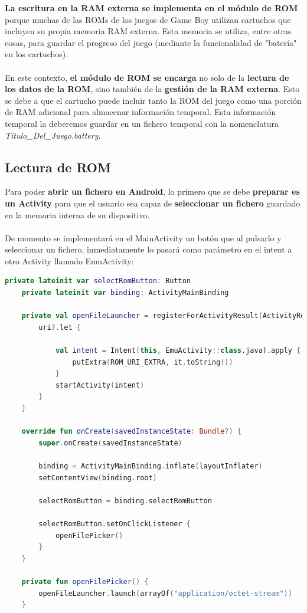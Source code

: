 \textbf{La escritura en la RAM externa se implementa en el módulo de ROM} porque muchas de las ROMs de los juegos de Game Boy utilizan cartuchos que incluyen su propia memoria RAM externa. Esta memoria se utiliza, entre otras cosas, para guardar el progreso del juego (mediante la funcionalidad de "batería" en los cartuchos).
\\\\
En este contexto, \textbf{el módulo de ROM se encarga} no solo de la \textbf{lectura de los datos de la ROM}, sino también de la \textbf{gestión de la RAM externa}. Esto se debe a que el cartucho puede incluir tanto la ROM del juego como una porción de RAM adicional para almacenar información temporal. Esta información temporal la deberemos guardar en un fichero temporal con la nomenclatura \textit{Titulo\_Del\_Juego.battery}.

\subsection{Lectura de ROM}

Para poder \textbf{abrir un fichero en Android}, lo primero que se debe \textbf{preparar es un Activity} para que el usuario sea capaz de \textbf{seleccionar un fichero} guardado en la memoria interna de su dispositivo.
\\\\
De momento se implementará en el MainActivity un botón que al pulsarlo y seleccionar un fichero, inmediatamente lo pasará como parámetro en el intent a otro Activity llamado EmuActivity:

\begin{lstlisting}[language=Kotlin, caption={Abrir archivos binarios en un Activity}, label={code:kotlinopenfile}]
    private lateinit var selectRomButton: Button
    private lateinit var binding: ActivityMainBinding

    private val openFileLauncher = registerForActivityResult(ActivityResultContracts.OpenDocument()) { uri ->
        uri?.let {

            val intent = Intent(this, EmuActivity::class.java).apply {
                putExtra(ROM_URI_EXTRA, it.toString())
            }
            startActivity(intent)
        }
    }

    override fun onCreate(savedInstanceState: Bundle?) {
        super.onCreate(savedInstanceState)

        binding = ActivityMainBinding.inflate(layoutInflater)
        setContentView(binding.root)

        selectRomButton = binding.selectRomButton

        selectRomButton.setOnClickListener {
            openFilePicker()
        }
    }

    private fun openFilePicker() {
        openFileLauncher.launch(arrayOf("application/octet-stream"))
    }
\end{lstlisting}

